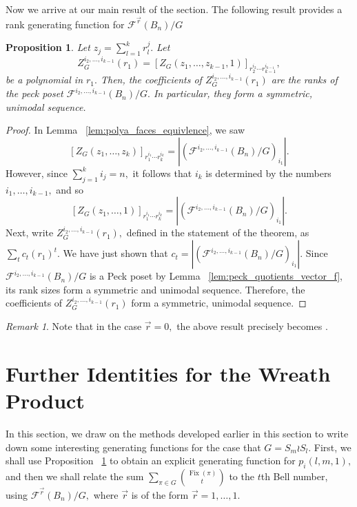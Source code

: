 \documentclass{amsart}
\newtheorem{prop}[thm]{Proposition}
\theoremstyle{remark}
\newtheorem{rem}[thm]{Remark}
\renewcommand{\vec}[1]{\overrightarrow{#1}}
\def\Fix{\operatorname{Fix}}
\begin{document}
Now we arrive at our main result of the section. The following result provides a rank generating function for $\mathcal F^{\vec r}(B_n)/G$

\begin{prop}
\label{prop:rank_gen_fn}
Let $z_j = \sum_{l = 1}^k r_l^j.$ Let $$Z_G^{i_2,\ldots,i_{k-1}}(r_1) =[Z_G(z_1,\ldots, z_{k-1},1)]_{r_2^{i_2}\cdots r_{k-1}^{i_{k-1}}},$$ be a polynomial in $r_1.$ Then, the coefficients of $Z_G^{i_2,\ldots,i_{k-1}}(r_1)$ are the ranks of the peck poset  $\mathcal F^{i_2,\ldots, i_{k-1}}(B_n)/G.$ In particular, they form a symmetric, unimodal sequence.
\end{prop}
\begin{proof}
In Lemma ~\ref{lem:polya_faces_equivlence}, we saw $$[Z_G(z_1,\ldots, z_k)]_{r_1^{i_1} \cdots r_k^{i_k}}=|(\mathcal F^{i_2,\ldots, i_{k-1}}(B_n)/G)_{i_1}|.$$
However, since $\sum_{j = 1}^k i_j = n,$ it follows that $i_k$ is determined by the numbers $i_1,\ldots, i_{k-1},$ and so 
$$[Z_G(z_1,\ldots, 1)]_{r_1^{i_1} \cdots r_k^{i_k}}=|(\mathcal F^{i_2,\ldots, i_{k-1}}(B_n)/G)_{i_1}|.$$
Next, write $Z_G^{i_2,\ldots,i_{k-1}}(r_1),$ defined in the statement of the theorem, as $\sum_{t} c_t (r_1)^t.$ We have just shown that $c_t = |(\mathcal F^{i_2,\ldots, i_{k-1}}(B_n)/G)_{i_1}|.$ Since $\mathcal F^{i_2,\ldots, i_{k-1}}(B_n)/G$ is a Peck poset by Lemma ~\ref{lem:peck_quotients_vector_f}, its rank sizes form a symmetric and unimodal sequence. Therefore, the coefficients of $Z_G^{i_2,\ldots,i_{k-1}}(r_1)$ form a symmetric, unimodal sequence.
\end{proof}

\begin{rem}
Note that in the case $\vec r = 0,$ the above result precisely becomes \cite[Corollary 7.16]{algebraic_stanley}.
\end{rem}

\section{Further Identities for the Wreath Product}
In this section, we draw on the methods developed earlier in this section to write down some interesting generating functions for the case that $G = S_m \wr S_l.$
First, we shall use Proposition ~\ref{prop:rank_gen_fn} to obtain an explicit generating function for $p_i(l,m,1),$ and then we shall relate the sum $\sum_{\pi \in G} \binom{\Fix(\pi)}{t}$ to the $t$th Bell number, using $\mathcal F^{\vec r}(B_n)/G,$ where $\vec r$ is of the form $\vec r = 1,\ldots, 1$.
\end{document}
